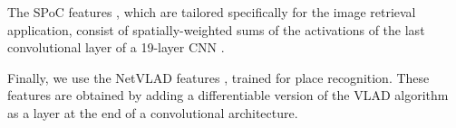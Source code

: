 The SPoC features \cite{babenko15}, which are tailored specifically for the image retrieval application, consist of spatially-weighted sums of the activations of the last convolutional layer of a 19-layer CNN \cite{SimonZisser15}.

Finally, we use the NetVLAD features \cite{Arandjelovic15}, trained for place recognition. These features are obtained by adding a differentiable version of the VLAD algorithm~\cite{Delhumeau2013} as a layer at the end of a convolutional architecture.



